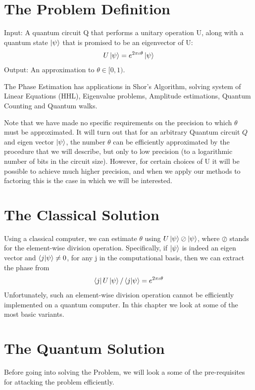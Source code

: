 \section{The Problem Definition}
\begin{problem}
    Input: A quantum circuit Q that performs a unitary operation U, along with a quantum state $\ket{\psi}$ that is promised to be an eigenvector of U:
    \[
    U\ket{\psi}=e^{2\pi\iota \theta}\ket{\psi}
    \]
    Output: An approximation to $\theta \in [0,1)$.
\end{problem}
The Phase Estimation has applications in Shor's Algorithm, solving system of Linear Equations (HHL), Eigenvalue problems, Amplitude estimations, Quantum Counting and Quantum walks.
\begin{remark}
    Note that we have made no specific requirements on the precision to which $\theta$ must be approximated. It will turn out that for an arbitrary Quantum circuit $Q$ and eigen vector $\ket{\psi}$, the number $\theta$ can be efficiently approximated by the procedure that we will describe, but only to low precision (to a logarithmic number of bits in the circuit size). However, for certain choices of U it will be possible to achieve much higher precision, and when we apply our methods to factoring this is the case in which we will be interested.
\end{remark}

\section{The Classical Solution}
Using a classical computer, we can estimate $\theta$ using $U\ket{\psi} \oslash \ket{\psi}$, where $\oslash$ stands for the element-wise division operation. Specifically, 
if $\ket{\psi}$ is indeed an eigen vector and $\braket{j|\psi}\neq 0$, for any j in the computational basis, then we can extract the phase from
\[
\bra{j}U\ket{\psi}/\braket{j|\psi}=e^{2\pi\iota \theta}
\]
Unfortunately, such an element-wise division operation cannot be efficiently implemented on a quantum computer.
In this chapter we look at some of the most basic variants.

\section{The Quantum Solution}
Before going into solving the Problem, we will look a some of the pre-requisites for attacking the problem efficiently.
